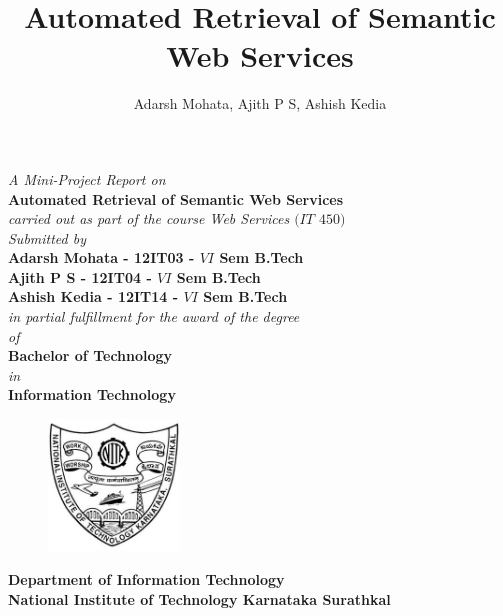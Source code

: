 \documentclass[12pt, oneside]{book}
\title{Automated Retrieval of Semantic Web Services}
\author{Adarsh Mohata, Ajith P S, Ashish Kedia}
\begin{document}
\begin{titlepage}
 \begin{center}
	\emph{A Mini-Project Report on} \\
\vspace{1cm}
\large
\textbf{Automated Retrieval of Semantic Web Services} \\
\normalsize
\vspace{1cm}
\emph{carried out as part of the course Web Services $(IT$ $450)$} \\
\vspace{1cm}
\emph{Submitted by} \\
\vspace{1cm}
\textbf{Adarsh Mohata - 12IT03 - $VI$ Sem B.Tech} \\
\vspace{4mm}
\textbf{Ajith P S - 12IT04 - $VI$ Sem B.Tech} \\
\vspace{4mm}
\textbf{Ashish Kedia - 12IT14 - $VI$ Sem B.Tech} \\
\vspace{1cm}
\emph{in partial fulfillment for the award of the degree} \\
\vspace{7mm}
\emph{of} \\
\vspace{7mm}
\textbf{Bachelor of Technology} \\
\vspace{7mm}
\emph{in} \\
\vspace{7mm}
\textbf{Information Technology}
\vspace{1cm}
\begin{figure}[H]
	\centering
	\includegraphics[height=3.5cm]{pics/nitk_logo.jpg}
\end{figure}
\vspace{1cm}
\textbf{Department of Information Technology} \\
\vspace{5mm}
\textbf{National Institute of Technology Karnataka Surathkal} \\
\vspace{5mm}
\end{center}
\end{titlepage}
\end{document}
